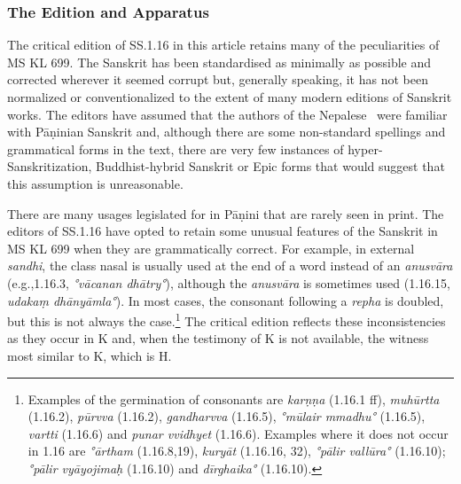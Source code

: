 \subsubsection{The Edition and Apparatus}
The critical edition of SS.1.16 in this article retains many of the peculiarities of MS KL 699. The Sanskrit has been standardised as minimally as possible and corrected wherever it seemed corrupt but, generally speaking, it has not been normalized or conventionalized to the extent of many modern editions of Sanskrit works. The editors have assumed that the authors of the Nepalese \SS\ were familiar with Pāṇinian Sanskrit and, although there are some non-standard spellings and grammatical forms in the text, there are very few instances of hyper-Sanskritization, Buddhist-hybrid Sanskrit or Epic forms that would suggest that this assumption is unreasonable. 

There are many usages legislated for in Pāṇini that are rarely seen in print. The editors of SS.1.16 have opted to retain some unusual features of the Sanskrit in MS KL 699 when they are grammatically correct. For example, in external \emph{sandhi}, the class nasal is usually used at the end of a word instead of an \emph{anusvāra} (e.g.,1.16.3, \emph{°vācanan dhātry°}), although the \emph{anusvāra} is sometimes used (1.16.15, \emph{udakaṃ dhānyāmla°}). In most cases, the consonant following a \emph{repha} is doubled, but this is not always the case.\footnote{Examples of the germination of consonants are \emph{karṇṇa} (1.16.1 ff), \emph{muhūrtta} (1.16.2), \emph{pūrvva} (1.16.2), \emph{gandharvva} (1.16.5), \emph{°mūlair mmadhu°} (1.16.5), \emph{vartti} (1.16.6) and \emph{punar vvidhyet} (1.16.6). Examples where it does not occur in 1.16 are  \emph{°ārtham} (1.16.8,19), \emph{kuryāt} (1.16.16, 32), \emph{°pālir vallūra°} (1.16.10); \emph{°pālir vyāyojimaḥ} (1.16.10) and \emph{dīrghaika°} (1.16.10).} The critical edition reflects these inconsistencies as they occur in K and, when the testimony of K is not available, the witness most similar to K, which is H.





